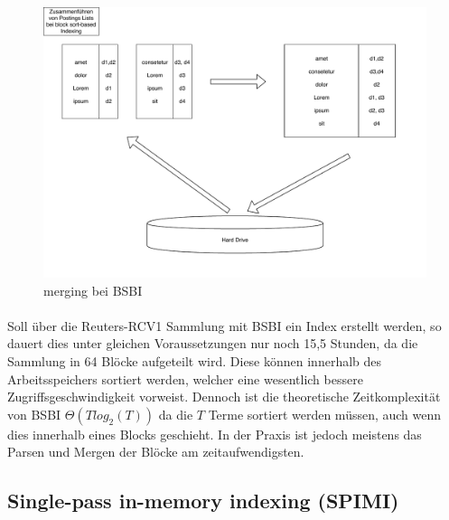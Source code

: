 \begin{figure}[ht]
  \includegraphics[width=\textwidth]{pdf/BSI_merging.pdf}
  \caption{merging bei BSBI}
  \label{bsiMerging}
\end{figure}

\paragraph{}
Soll über die Reuters-RCV1 Sammlung mit BSBI ein Index erstellt werden, so dauert dies unter gleichen Voraussetzungen nur noch 15,5 Stunden, da die Sammlung in 64 Blöcke aufgeteilt wird. Diese können innerhalb des Arbeitsspeichers sortiert werden, welcher eine wesentlich bessere Zugriffsgeschwindigkeit vorweist. Dennoch ist die theoretische Zeitkomplexität von BSBI $\Theta( T log_2 ( T))$ da die $T$ Terme sortiert werden müssen, auch wenn dies innerhalb eines Blocks geschieht. In der Praxis ist jedoch meistens das Parsen und Mergen der Blöcke am zeitaufwendigsten.\par

\subsection{Single-pass in-memory indexing (SPIMI)}

